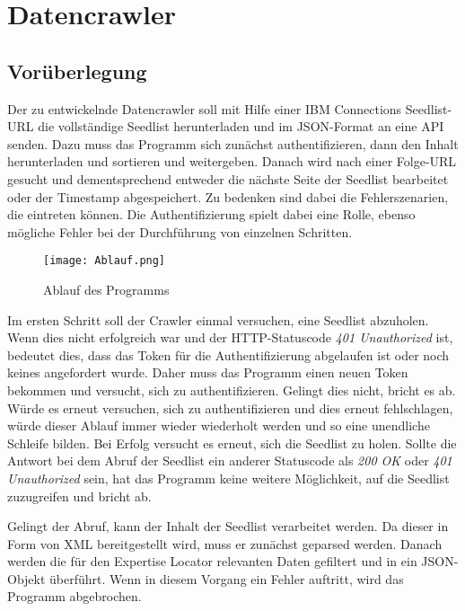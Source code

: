 
\chapter{Datencrawler}

\section{Vorüberlegung}
Der zu entwickelnde Datencrawler soll mit Hilfe einer IBM Connections Seedlist-\ac{URL} die vollständige Seedlist herunterladen und im JSON-Format an eine API senden. Dazu muss das Programm sich zunächst authentifizieren, dann den Inhalt herunterladen und sortieren und weitergeben. Danach wird nach einer Folge-\ac{URL} gesucht und dementsprechend entweder die nächste Seite der Seedlist bearbeitet oder der Timestamp abgespeichert. Zu bedenken sind dabei die Fehlerszenarien, die eintreten können. Die Authentifizierung spielt dabei eine Rolle, ebenso mögliche Fehler bei der Durchführung von einzelnen Schritten.
\begin{figure}[ht]
\centering
\texttt{[image: Ablauf.png]}
\caption{Ablauf des Programms}
\end{figure}

Im ersten Schritt soll der Crawler einmal versuchen, eine Seedlist abzuholen. Wenn dies nicht erfolgreich war und der HTTP-Statuscode \textit{401 Unauthorized} ist, bedeutet dies, dass das Token für die Authentifizierung abgelaufen ist oder noch keines angefordert wurde. Daher muss das Programm einen neuen Token bekommen und versucht, sich zu authentifizieren. Gelingt dies nicht, bricht es ab. Würde es erneut versuchen, sich zu authentifizieren und dies erneut fehlschlagen, würde dieser Ablauf immer wieder wiederholt werden und so eine unendliche Schleife bilden. Bei Erfolg versucht es erneut, sich die Seedlist zu holen. Sollte die Antwort bei dem Abruf der Seedlist ein anderer Statuscode als \textit{200 OK} oder \textit{401 Unauthorized} sein, hat das Programm keine weitere Möglichkeit, auf die Seedlist zuzugreifen und bricht ab.

Gelingt der Abruf, kann der Inhalt der Seedlist verarbeitet werden. Da dieser in Form von XML bereitgestellt wird, muss er zunächst geparsed werden. Danach werden die für den Expertise Locator relevanten Daten gefiltert und in ein JSON-Objekt überführt. Wenn in diesem Vorgang ein Fehler auftritt, wird das Programm abgebrochen.

